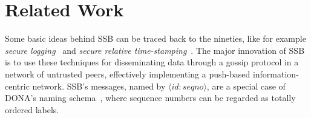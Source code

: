 \documentclass[9pt,sigconf]{acmart}
\begin{document}
%
%


\section{Related Work}
\label{sect:relwork}

Some basic ideas behind SSB can be traced back to the nineties, like
for example {\em secure logging}~\cite{schneier1998cryptographic} and {\em secure
relative time-stamping}~\cite{haber1990time}. The major innovation of
SSB is to use these techniques for disseminating data through a gossip
protocol in a network of untrusted peers, effectively implementing a
push-based information-centric network. SSB's messages, named by $\langle id:seqno\rangle$, are a special case of DONA's naming schema~\cite{Koponen:2007:DNA:1282380.1282402}, where sequence numbers can be regarded as totally ordered labels.
\end{document}
